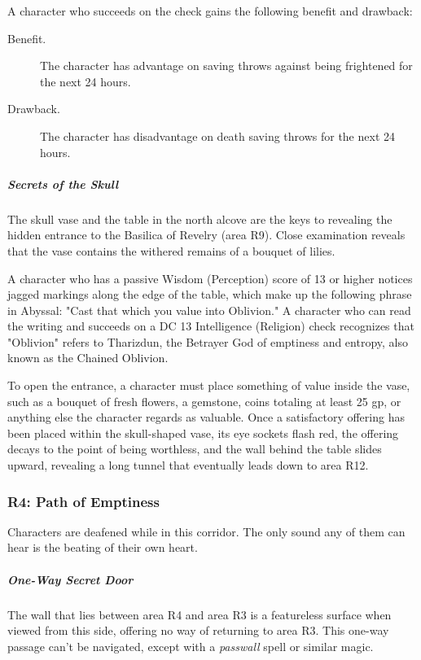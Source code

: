 \documentclass[10pt,a4paper,twoside,bg=print,twocolumn,openany,nodeprecatedcode]{dndbook}
\begin{document}
A character who succeeds on the check gains the following benefit and drawback:

\begin{DndSidebar}[float=!b]{}

\begin{description}
\item[Benefit.]
The character has advantage on saving throws against being frightened for the next 24 hours.
\item[Drawback.]
The character has disadvantage on death saving throws for the next 24 hours.
\end{description}



\end{DndSidebar}

\subparagraph{Secrets of the Skull}
The skull vase and the table in the north alcove are the keys to revealing the hidden entrance to the Basilica of Revelry (area R9). Close examination reveals that the vase contains the withered remains of a bouquet of lilies.

A character who has a passive Wisdom (Perception) score of 13 or higher notices jagged markings along the edge of the table, which make up the following phrase in Abyssal: "Cast that which you value into Oblivion." A character who can read the writing and succeeds on a DC 13 Intelligence (Religion) check recognizes that "Oblivion" refers to Tharizdun, the Betrayer God of emptiness and entropy, also known as the Chained Oblivion.

To open the entrance, a character must place something of value inside the vase, such as a bouquet of fresh flowers, a gemstone, coins totaling at least 25 gp, or anything else the character regards as valuable. Once a satisfactory offering has been placed within the skull-shaped vase, its eye sockets flash red, the offering decays to the point of being worthless, and the wall behind the table slides upward, revealing a long tunnel that eventually leads down to area R12.

\subsubsection{R4: Path of Emptiness}
Characters are deafened while in this corridor. The only sound any of them can hear is the beating of their own heart.

\subparagraph{One-Way Secret Door}
The wall that lies between area R4 and area R3 is a featureless surface when viewed from this side, offering no way of returning to area R3. This one-way passage can't be navigated, except with a \textit{passwall} spell or similar magic.
\end{document}
